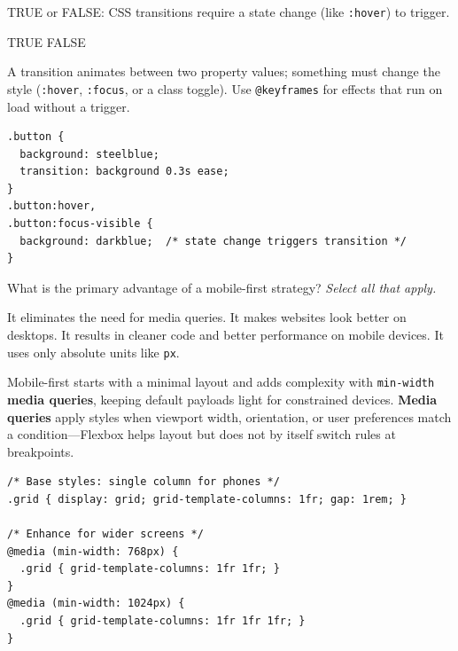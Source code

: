 \question[4]
TRUE or FALSE: CSS transitions require a state change (like \texttt{:hover}) to trigger.
\begin{choices}
  \CorrectChoice TRUE
  \choice FALSE
\end{choices}
\begin{solution}
  A transition animates between two property values; something must change the style (\texttt{:hover}, \texttt{:focus}, or a class toggle). Use \texttt{@keyframes} for effects that run on load without a trigger.
\begin{lstlisting}[style=css]
.button {
  background: steelblue;
  transition: background 0.3s ease;
}
.button:hover,
.button:focus-visible {
  background: darkblue;  /* state change triggers transition */
}
\end{lstlisting}
\end{solution}

\question[4]
What is the primary advantage of a mobile-first strategy? \emph{Select all that apply.}
\begin{checkboxes}
  \choice It eliminates the need for media queries.
  \choice It makes websites look better on desktops.
  \CorrectChoice It results in cleaner code and better performance on mobile devices.
  \choice It uses only absolute units like \texttt{px}.
\end{checkboxes}
\begin{solution}
  Mobile-first starts with a minimal layout and adds complexity with \texttt{min-width} \textbf{media queries}, keeping default payloads light for constrained devices. \textbf{Media queries} apply styles when viewport width, orientation, or user preferences match a condition---Flexbox helps layout but does not by itself switch rules at breakpoints.
\begin{lstlisting}[style=css]
/* Base styles: single column for phones */
.grid { display: grid; grid-template-columns: 1fr; gap: 1rem; }

/* Enhance for wider screens */
@media (min-width: 768px) {
  .grid { grid-template-columns: 1fr 1fr; }
}
@media (min-width: 1024px) {
  .grid { grid-template-columns: 1fr 1fr 1fr; }
}
\end{lstlisting}
\end{solution}

